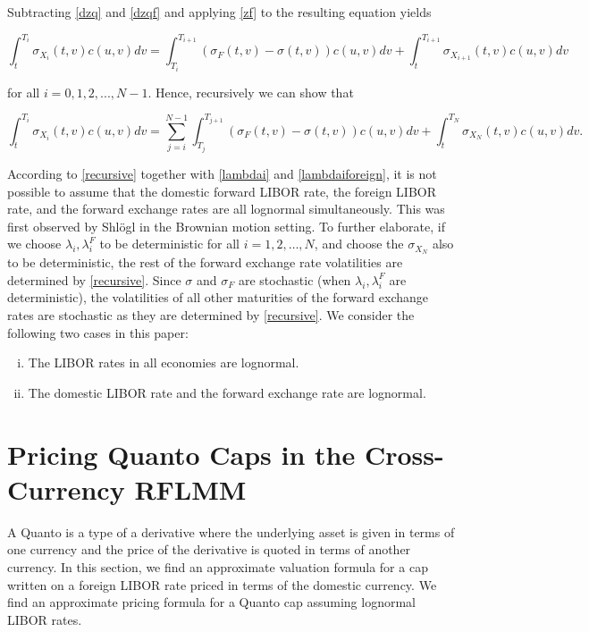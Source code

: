 \documentclass[11pt]{article}
\begin{document}
Subtracting \eqref{dzq} and \eqref{dzqf} and applying \eqref{zf}  to the resulting equation yields

\begin{equation}
    \int_t^{T_i}\sigma_{X_i}(t,v)c(u,v)dv=\int_{T_i}^{T_{i+1}}(\sigma_F(t,v)-\sigma(t,v))c(u,v)dv+\int_t^{T_{i+1}}\sigma_{X_{i+1}}(t,v)c(u,v)dv
\end{equation}

for all $i=0,1,2,...,N-1$. Hence, recursively we can show that 

\begin{equation}\label{recursive}
    \int_t^{T_i}\sigma_{X_i}(t,v)c(u,v)dv=\sum_{j=i}^{N-1}\int_{T_j}^{T_{j+1}}(\sigma_F(t,v)-\sigma(t,v))c(u,v)dv+\int_t^{T_{N}}\sigma_{X_{N}}(t,v)c(u,v)dv.
\end{equation}

According to \eqref{recursive} together with \eqref{lambdai} and \eqref{lambdaiforeign}, it is not possible to assume that the domestic forward LIBOR rate, the foreign LIBOR rate, and the forward exchange rates are all lognormal simultaneously. This was first observed by Shl\"ogl \cite{schlogl} in the Brownian motion setting. To further elaborate, if we choose $\lambda_i,\lambda_i^F$ to be deterministic for all $i=1,2,\dots,N$, and choose the $\sigma_{X_N}$ also to be deterministic, the rest of the forward exchange rate volatilities are determined by \eqref{recursive}. Since $\sigma$ and $\sigma_F$ are stochastic (when $\lambda_i, \lambda_i^F$ are deterministic), the volatilities of all other maturities of the forward exchange rates are stochastic as they are determined by \eqref{recursive}. We consider the following two cases in this paper: 

\begin{enumerate}[(i)]
    \item The LIBOR rates in all economies are lognormal.
    \item The domestic LIBOR rate and the forward exchange rate are lognormal.
\end{enumerate}

\section{Pricing Quanto Caps in the Cross-Currency RFLMM}

A Quanto is a type of a derivative where the underlying asset is given in terms of one currency and the price of the derivative is quoted in terms of another currency. In this section, we find an approximate valuation formula for a cap written on a foreign LIBOR rate priced in terms of the domestic currency. We find an approximate pricing formula for a Quanto cap assuming lognormal LIBOR rates.\\
\end{document}
